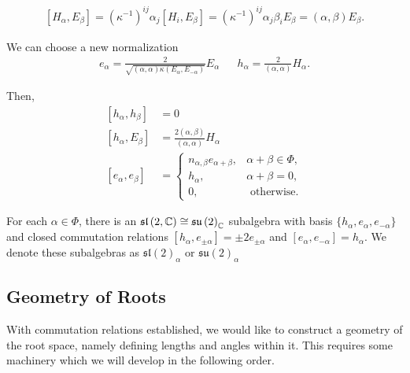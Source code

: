\begin{note}
    \begin{align}
        \left[ H_\alpha, E_\beta \right] = \left( \kappa^{-1} \right)^{ij} \alpha_j \left[ H_i, E_\beta \right] = \left( \kappa^{-1} \right)^{ij} \alpha_j \beta_i E_\beta = \left( \alpha, \beta \right) E_\beta
    .\end{align}
\end{note}

We can choose a new normalization
\begin{align}
    e_\alpha = \frac{2}{\sqrt{\left( \alpha, \alpha \right) \kappa \left( E_\alpha, E_{-\alpha} \right) } } E_\alpha && h_\alpha = \frac{2}{\left( \alpha, \alpha \right) } H_\alpha
.\end{align}

Then,
\begin{align}
    \left[ h_\alpha, h_\beta \right] &=0 \\
    \left[ h_\alpha, E_\beta \right]  &= \frac{2\left( \alpha, \beta \right) }{\left( \alpha, \alpha \right) } H_\alpha \\
    \left[ e_\alpha, e_\beta \right] &= \begin{cases}
        n_{\alpha, \beta} e_{\alpha + \beta}, & \alpha + \beta \in \Phi, \\
        h_\alpha, & \alpha + \beta = 0,\\
        0, & \text{~otherwise.}
    \end{cases}
\end{align}

\begin{note}
    For each $\alpha \in \Phi$, there is an $\mathfrak{sl}\left( 2, \mathbb{C} \right) \cong \mathfrak{su}\left( 2 \right)_{\mathbb{C}}$ subalgebra with basis $\{h_\alpha, e_\alpha, e_{-\alpha}\} $ and closed commutation relations $\left[ h_\alpha, e_{\pm \alpha} \right]  = \pm 2 e_{\pm \alpha}$ and $\left[ e_{\alpha}, e_{-\alpha} \right] = h_{\alpha}$. We denote these subalgebras as $\mathfrak{sl}\left( 2 \right)_{\alpha}$ or $\mathfrak{su}\left( 2 \right)_{\alpha}$
\end{note}

\subsection{Geometry of Roots}

With commutation relations established, we would like to construct a geometry of the root space, namely defining lengths and angles within it. This requires some machinery which we will develop in the following order.

